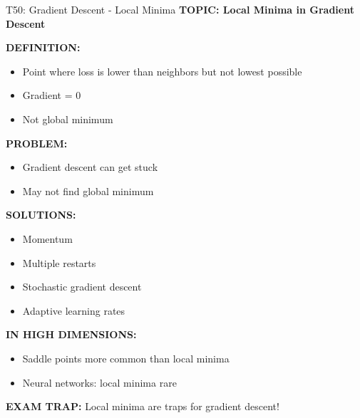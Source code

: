 \documentclass[8pt]{beamer}
\begin{document}
	\begin{frame}{T50: Gradient Descent - Local Minima}
		\fontsize{6.5}{7.5}\selectfont
		\textbf{TOPIC: Local Minima in Gradient Descent}
		
		\vspace{0.1cm}
		\textbf{DEFINITION:}
		\begin{itemize}
			\item Point where loss is lower than neighbors but not lowest possible
			\item Gradient = 0
			\item Not global minimum
		\end{itemize}
		
		\vspace{0.1cm}
		\textbf{PROBLEM:}
		\begin{itemize}
			\item Gradient descent can get stuck
			\item May not find global minimum
		\end{itemize}
		
		\vspace{0.1cm}
		\textbf{SOLUTIONS:}
		\begin{itemize}
			\item Momentum
			\item Multiple restarts
			\item Stochastic gradient descent
			\item Adaptive learning rates
		\end{itemize}
		
		\vspace{0.1cm}
		\textbf{IN HIGH DIMENSIONS:}
		\begin{itemize}
			\item Saddle points more common than local minima
			\item Neural networks: local minima rare
		\end{itemize}
		
		\textcolor{myred}{\textbf{EXAM TRAP:}} Local minima are \textcolor{myblue}{traps} for gradient descent!
	\end{frame}
	
\end{document}
